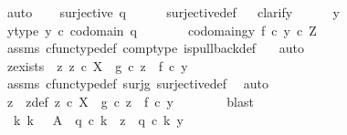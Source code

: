 \begin{isabellebody}
\ auto\isanewline
\ \ \isamarkupfalse%
\ {\isachardoublequoteopen}surjective\ q{}{\isachardoublequoteclose}\isanewline
\ \ \ \ \isamarkupfalse%
\ surjective{\isacharunderscore}{\kern0pt}def\isanewline
\ \ \isamarkupfalse%
{\isacharparenleft}{\kern0pt}clarify{\isacharparenright}{\kern0pt}\isanewline
\ \ \ \ \isamarkupfalse%
\ y\isanewline
\ \ \ \ \isamarkupfalse%
\ y{\isacharunderscore}{\kern0pt}type{\isacharcolon}{\kern0pt}\ {\isachardoublequoteopen}y\ {\isasymin}\isactrlsub c\ codomain\ q{}{\isachardoublequoteclose}\isanewline
\ \ \ \ \isamarkupfalse%
\ \isamarkupfalse%
\ codomain{\isacharunderscore}{\kern0pt}gy{\isacharcolon}{\kern0pt}\ {\isachardoublequoteopen}f\ {\isasymcirc}\isactrlsub c\ y\ {\isasymin}\isactrlsub c\ Z{\isachardoublequoteclose}\isanewline
\ \ \ \ \ \ \isamarkupfalse%
\ assms{\isacharparenleft}{\kern0pt}{}{\isacharparenright}{\kern0pt}\ cfunc{\isacharunderscore}{\kern0pt}type{\isacharunderscore}{\kern0pt}def\ comp{\isacharunderscore}{\kern0pt}type\ is{\isacharunderscore}{\kern0pt}pullback{\isacharunderscore}{\kern0pt}def\ \ \isamarkupfalse%
\ auto\isanewline
\ \ \ \ \isamarkupfalse%
\ \isamarkupfalse%
\ z{\isacharunderscore}{\kern0pt}exists{\isacharcolon}{\kern0pt}\ {\isachardoublequoteopen}{\isasymexists}\ z{\isachardot}{\kern0pt}\ z\ {\isasymin}\isactrlsub c\ X\ {\isasymand}\ g\ {\isasymcirc}\isactrlsub c\ z\ {\isacharequal}{\kern0pt}\ f\ {\isasymcirc}\isactrlsub c\ y{\isachardoublequoteclose}\isanewline
\ \ \ \ \ \ \isamarkupfalse%
\ assms{\isacharparenleft}{\kern0pt}{}{\isacharparenright}{\kern0pt}\ cfunc{\isacharunderscore}{\kern0pt}type{\isacharunderscore}{\kern0pt}def\ surj{\isacharunderscore}{\kern0pt}g\ surjective{\isacharunderscore}{\kern0pt}def\ \isamarkupfalse%
\ auto\isanewline
\ \ \ \ \isamarkupfalse%
\ \isamarkupfalse%
\ z\ \ z{\isacharunderscore}{\kern0pt}def{\isacharcolon}{\kern0pt}\ {\isachardoublequoteopen}z\ {\isasymin}\isactrlsub c\ X\ {\isasymand}\ g\ {\isasymcirc}\isactrlsub c\ z\ {\isacharequal}{\kern0pt}\ f\ {\isasymcirc}\isactrlsub c\ y{\isachardoublequoteclose}\isanewline
\ \ \ \ \ \ \isamarkupfalse%
\ blast\isanewline
\ \ \ \ \isamarkupfalse%
\ \isamarkupfalse%
\ {\isachardoublequoteopen}{\isasymexists}{\isacharbang}{\kern0pt}\ k{\isachardot}{\kern0pt}\ k{\isacharcolon}{\kern0pt}\ {\isasymone}\ {\isasymrightarrow}\ A\ {\isasymand}\ q{}\ {\isasymcirc}\isactrlsub c\ k\ {\isacharequal}{\kern0pt}\ z\ {\isasymand}\ q{}\ {\isasymcirc}\isactrlsub c\ k\ {\isacharequal}{\kern0pt}y{\isachardoublequoteclose}\isanewline

\end{isabellebody}
